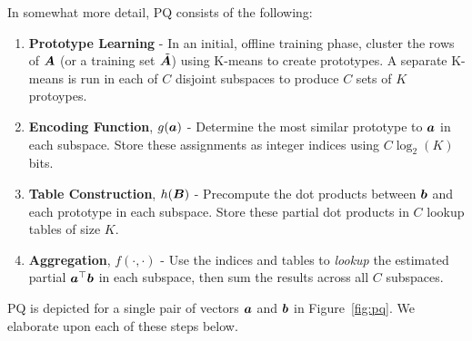 In somewhat more detail, PQ consists of the following:
\vspace{-3mm}
\begin{enumerate}\itemsep.5mm
    \item \textbf{Prototype Learning} - In an initial, offline training phase,  cluster the rows of $\bm{A}$ (or a training set $\tilde{\bm{A}}$) using K-means to create prototypes. A separate K-means is run in each of $C$ disjoint subspaces to produce $C$ sets of $K$ protoypes. %
    \item \textbf{Encoding Function}, $g(\bm{a})$ - Determine the most similar prototype to $\bm{a}$ in each subspace. Store these assignments as integer indices using $C \log_2(K)$ bits.
    \item \textbf{Table Construction}, $h(\bm{B})$ - Precompute the dot products between $\bm{b}$ and each prototype in each subspace. Store these partial dot products in $C$ lookup tables of size $K$.
    \item \textbf{Aggregation}, $f(\cdot,\cdot)$ - Use the indices and tables to \textit{lookup} the estimated partial $\bm{a}^\top \bm{b}$ in each subspace, then sum the results across all $C$ subspaces. %
\end{enumerate}
\vspace{-3mm}
PQ is depicted for a single pair of vectors $\bm{a}$ and $\bm{b}$ in Figure~\ref{fig:pq}. We elaborate upon each of these steps below.

\vspace{-2mm}
